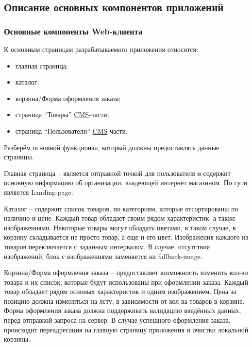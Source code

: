 \subsection{Описание основных компонентов приложений}\label{subsec:2-common-components}\indent


\subsubsection{Основные компоненты Web-клиента}

К основным страницам разрабатываемого приложения относятся:

\begin{itemize}
    \item главная страница;
    \item каталог;
    \item корзина/Форма оформления заказа;
    \item страница “Товары” \hyperlink{gloss:cms}{CMS}-части;
    \item страница “Пользователи” \hyperlink{gloss:cms}{CMS}-части.
\end{itemize}

Разберём основной функционал, который должны предоставлять данные страницы.

Главная страница – является отправной точкой для пользователя и содержит основную информацию об организации, владеющей интернет магазином.
По сути является Landing-page.

Каталог – содержит список товаров, по категориям, которые отсортированы по наличию и цене.
Каждый товар обладает своим рядом характеристик, а также изображениями.
Некоторые товары могут обладать цветами, в таком случае, в корзину складывается не просто товар, а еще и его цвет.
Изображения каждого из товаров переключается с заданным интервалом.
В случае, отсутствия изображений, блок с изображениями заменяется на fallback-image.

Корзина/Форма оформления заказа – предоставляет возможность изменить кол-во товара и их список, которые будут использованы при оформлении заказа.
Каждый товар обладает рядом осноных характеристик и одним изображением.
Цена за позицию должна изменяться на лету, в зависимости от кол-ва товаров в корзине.
Форма оформления заказа должна поддерживать валидацию введённых данных, перед отправкой запроса на сервер.
В случае успешного оформления заказа, происходит переадресация на главную страницу приложения и очистки локальной корзины.

